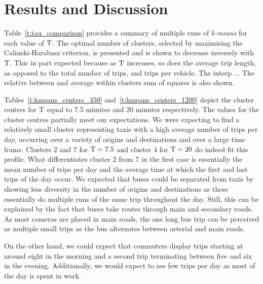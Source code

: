 \section{Results and Discussion}\label{s.results}

Table~\ref{t:tau_comparison} provides a summary of multiple runs of \emph{k-means} for each value of $\mathrm{T}$. The optimal number of clusters, selected by maximising the Calinski-Harabasz criterion, is presented and is shown to decrease inversely with $\mathrm{T}$. This in part expected because as $\mathrm{T}$ increases, so does the average trip length, as opposed to the total number of trips, and trips per vehicle.  {\color{blue}The interp   ...} The relative between and average within clusters sum of squares is also shown.

Tables~\ref{t:kmeans_centers_450} and~\ref{t:kmeans_centers_1200} depict the cluster centres for $\mathrm{T}$ equal to 7.5 minutes and 20 minutes respectively. The values for the cluster centres partially meet our expectations. We were expecting to find a relatively small cluster representing taxis with a high average number of trips per day, occurring over a variety of origins and destinations and over a large time frame. Clusters 2 and 7 for $\mathrm{T} = 7.5$ and cluster 4 for $\mathrm{T} = 20$ do indeed fit this profile. What differentiates cluster 2 from 7 in the first case is essentially the mean number of trips per day and the average time at which the first and last trips of the day occur. We expected that buses could be separated from taxis by showing less diversity in the number of origins and destinations as these essentially do multiple runs of the same trip throughout the day. Still, this can be explained by the fact that buses take routes through main and secondary roads. As most cameras are placed in main roads, the one long bus trip can be perceived as multiple small trips as the bus alternates between arterial and main roads.

On the other hand, we could expect that commuters display trips starting at around eight in the morning and a second trip terminating between five and six in the evening. Additionally, we would expect to see few trips per day as most of the day is spent in work.

